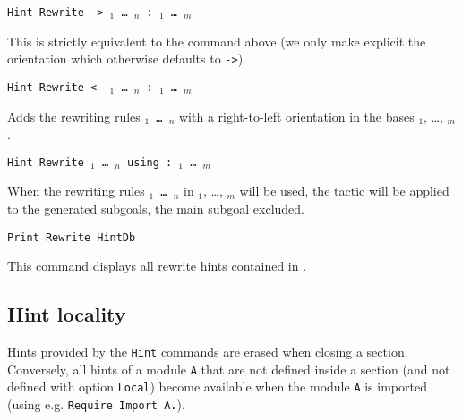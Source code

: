 \begin{coq_example*}
\begin{Variants}
\item {\tt Hint Rewrite -> \term$_1$ \mbox{\dots} \term$_n$ :~\ident$_1$ \mbox{\dots} \ident$_m$}

This is strictly equivalent to the command above (we only make explicit the
orientation which otherwise defaults to {\tt ->}).

\item {\tt Hint Rewrite <- \term$_1$ \mbox{\dots} \term$_n$ :~\ident$_1$ \mbox{\dots} \ident$_m$}

Adds the rewriting rules {\tt \term$_1$ \mbox{\dots} \term$_n$} with a right-to-left
orientation in the bases \ident$_1$, \dots, \ident$_m$.

\item {\tt Hint Rewrite \term$_1$ \mbox{\dots} \term$_n$ using {\tac} :~\ident$_1$ \mbox{\dots} \ident$_m$}

When the rewriting rules {\tt \term$_1$ \mbox{\dots} \term$_n$} in \ident$_1$, \dots, \ident$_m$ will
be used, the tactic {\tt \tac} will be applied to the generated subgoals, the
main subgoal excluded.


\item \texttt{Print Rewrite HintDb {\ident}}

  This command displays all rewrite hints contained in {\ident}.

\end{Variants}

\subsection{Hint locality
\label{Hint-Locality}}

Hints provided by the \texttt{Hint} commands are erased when closing a
section. Conversely, all hints of a module \texttt{A} that are not
defined inside a section (and not defined with option {\tt Local}) become
available when the module {\tt A} is imported (using
e.g. \texttt{Require Import A.}).


\end{coq_example*}
